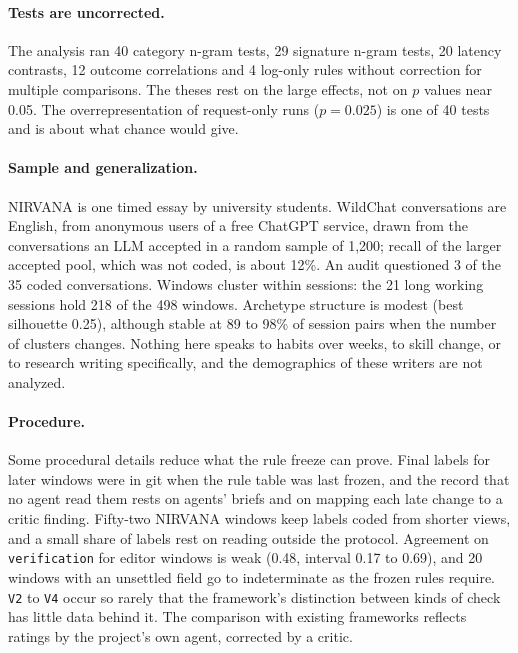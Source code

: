 \documentclass[manuscript,screen]{acmart}
\newcommand{\code}[1]{\texttt{#1}}
\begin{document}
\paragraph{Tests are uncorrected.} The analysis ran 40 category n-gram tests, 29 signature n-gram tests, 20 latency contrasts, 12 outcome correlations and 4 log-only rules without correction for multiple comparisons. The theses rest on the large effects, not on $p$ values near 0.05. The overrepresentation of request-only runs ($p = 0.025$) is one of 40 tests and is about what chance would give.

\paragraph{Sample and generalization.} NIRVANA is one timed essay by university students. WildChat conversations are English, from anonymous users of a free ChatGPT service, drawn from the conversations an LLM accepted in a random sample of 1,200; recall of the larger accepted pool, which was not coded, is about 12\%. An audit questioned 3 of the 35 coded conversations. Windows cluster within sessions: the 21 long working sessions hold 218 of the 498 windows. Archetype structure is modest (best silhouette 0.25), although stable at 89 to 98\% of session pairs when the number of clusters changes. Nothing here speaks to habits over weeks, to skill change, or to research writing specifically, and the demographics of these writers are not analyzed.

\paragraph{Procedure.} Some procedural details reduce what the rule freeze can prove. Final labels for later windows were in git when the rule table was last frozen, and the record that no agent read them rests on agents' briefs and on mapping each late change to a critic finding. Fifty-two NIRVANA windows keep labels coded from shorter views, and a small share of labels rest on reading outside the protocol. Agreement on \code{verification} for editor windows is weak (0.48, interval 0.17 to 0.69), and 20 windows with an unsettled field go to indeterminate as the frozen rules require. \code{V2} to \code{V4} occur so rarely that the framework's distinction between kinds of check has little data behind it. The comparison with existing frameworks reflects ratings by the project's own agent, corrected by a critic.
\end{document}
